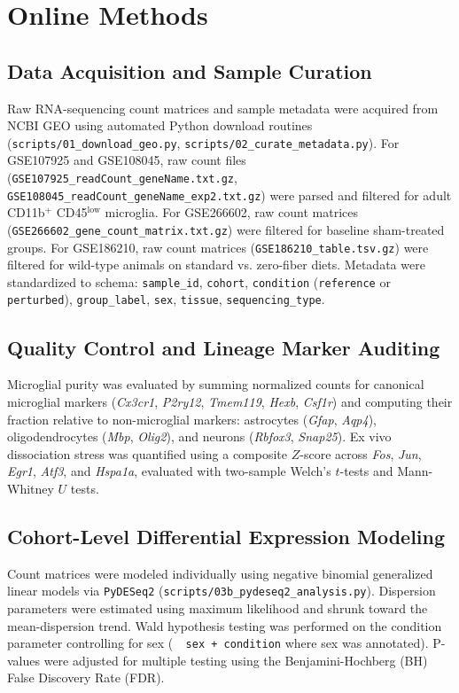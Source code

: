 \documentclass[10pt,a4paper]{article}
\begin{document}
\vspace{1.8em}
\section{Online Methods}
\sloppy
\subsection{Data Acquisition and Sample Curation}
Raw RNA-sequencing count matrices and sample metadata were acquired from NCBI GEO using automated Python download routines (\texttt{\small scripts/01\_download\_geo.py}, \texttt{\small scripts/02\_curate\_metadata.py}). For GSE107925 and GSE108045, raw count files (\texttt{\small GSE107925\_readCount\_geneName.txt.gz}, \texttt{\small GSE108045\_readCount\_geneName\_exp2.txt.gz}) were parsed and filtered for adult CD11b$^{+}$ CD45$^{\text{low}}$ microglia. For GSE266602, raw count matrices (\texttt{\small GSE266602\_gene\_count\_matrix.txt.gz}) were filtered for baseline sham-treated groups. For GSE186210, raw count matrices (\texttt{\small GSE186210\_table.tsv.gz}) were filtered for wild-type animals on standard vs. zero-fiber diets. Metadata were standardized to schema: \texttt{\small sample\_id}, \texttt{\small cohort}, \texttt{\small condition} (\texttt{\small reference} or \texttt{\small perturbed}), \texttt{\small group\_label}, \texttt{\small sex}, \texttt{\small tissue}, \texttt{\small sequencing\_type}.

\subsection{Quality Control and Lineage Marker Auditing}
Microglial purity was evaluated by summing normalized counts for canonical microglial markers (\textit{Cx3cr1}, \textit{P2ry12}, \textit{Tmem119}, \textit{Hexb}, \textit{Csf1r}) and computing their fraction relative to non-microglial markers: astrocytes (\textit{Gfap}, \textit{Aqp4}), oligodendrocytes (\textit{Mbp}, \textit{Olig2}), and neurons (\textit{Rbfox3}, \textit{Snap25}). Ex vivo dissociation stress was quantified using a composite $Z$-score across \textit{Fos}, \textit{Jun}, \textit{Egr1}, \textit{Atf3}, and \textit{Hspa1a}, evaluated with two-sample Welch's $t$-tests and Mann-Whitney $U$ tests.

\subsection{Cohort-Level Differential Expression Modeling}
Count matrices were modeled individually using negative binomial generalized linear models via \texttt{\small PyDESeq2} (\texttt{\small scripts/03b\_pydeseq2\_analysis.py}). Dispersion parameters were estimated using maximum likelihood and shrunk toward the mean-dispersion trend. Wald hypothesis testing was performed on the condition parameter controlling for sex (\texttt{\small ~ sex + condition} where sex was annotated). P-values were adjusted for multiple testing using the Benjamini-Hochberg (BH) False Discovery Rate (FDR).
\end{document}
